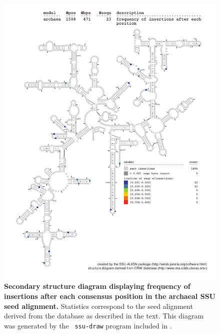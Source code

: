 \begin{figure}
\begin{center}
\includegraphics[width=5.7in]{Figures/archaea-0p1-ifreq}
\end{center}
\caption[Secondary structure diagram displaying frequency of insertions
  after each consensus position in the archaeal SSU seed
  alignment]{\textbf{Secondary structure diagram displaying frequency
  of insertions after each consensus position in the archaeal SSU seed
  alignment.} Statistics correspond to the  seed
  alignment derived from the  database \cite{CannoneGutell02}
  as described in the text. This diagram was generated by the {\tt
  ssu-draw} program included in .}
\label{fig:arcifreq}
\end{figure}

